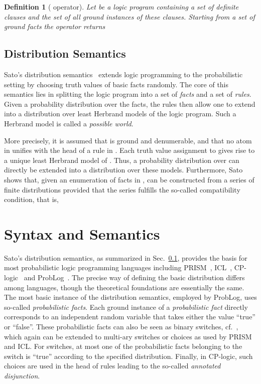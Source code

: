 \documentclass{tlp}
\newtheorem{definition}{Definition}
\begin{document}
\begin{definition}[ operator]
  \label{def:tpop}
  Let  be a logic program containing a set of definite clauses and
   the set of all ground instances of these clauses.
  Starting from a set of ground facts  the  operator returns
  
\end{definition}


\subsection{Distribution Semantics}
\label{sec:ds}

Sato's distribution semantics~\cite{Sato:95} extends logic programming
to the probabilistic setting by choosing truth values of basic facts
randomly.  The core of this semantics lies in splitting the logic
program into a set  of \emph{facts} and a set  of
\emph{rules}. Given a probability distribution  over the facts,
the rules then allow one to extend  into a distribution over
least Herbrand models of the logic program. Such a Herbrand model is
called a \emph{possible world}.

More precisely, it is assumed that  is ground and
denumerable, and that no atom in  unifies with the head of a rule
in . Each truth value assignment to  gives rise to a unique
least Herbrand model of . Thus, a probability distribution 
over  can directly be extended into a distribution  over
these models. Furthermore, Sato shows that, given an enumeration
 of facts in ,  can be constructed from a
series of finite distributions 
provided that the series fulfills the so-called compatibility
condition, that is,


\section{Syntax and Semantics}
\label{sec:semantics} 

Sato's distribution semantics, as summarized in Sec.~\ref{sec:ds},
provides the basis for most probabilistic logic programming languages
including PRISM~\cite{SatoKameya:01}, ICL~\cite{Poole08},
CP-logic~\cite{Vennekens09} and ProbLog~\cite{DeRaedt07-IJCAIa}.  The
precise way of defining the basic distribution  differs among
languages, though the theoretical foundations are essentially the
same. The most basic instance of the distribution semantics, employed
by ProbLog, uses so-called \emph{probabilistic facts}.  Each ground
instance of a \emph{probabilistic fact} directly corresponds to an
independent random variable that takes either the value ``true'' or
``false''. These probabilistic facts can also be seen as binary
switches, cf.~\cite{Sato:95}, which again can be extended to multi-ary
switches or choices as used by PRISM and ICL. For switches, at most
one of the probabilistic facts belonging to the switch is ``true''
according to the specified distribution. Finally, in CP-logic, such
choices are used in the head of rules leading to the so-called
\emph{annotated disjunction}.
\end{document}
